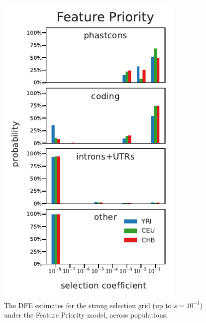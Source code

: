 \documentclass[11pt]{article}
\begin{document}
\begin{figure}[htbp]
    \label{suppfig:strong-sel-dfe-pop-phastcons}
  \centering
  \includegraphics[width=0.8\textwidth]{figures/supplementary/feature_priority_pop_dfe_strongselgrid.pdf}

  \caption{The DFE estimates for the strong selection grid (up to $s=10^{-1}$)
  under the Feature Priority model, across populations.}
\end{figure}
\end{document}
